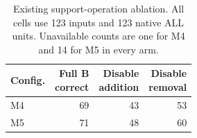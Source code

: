 \begin{table}[htbp]
\centering
\small
\caption{Existing support-operation ablation. All cells use 123 inputs and 123 native ALL units.
Unavailable counts are one for M4 and 14 for M5 in every arm.}
\label{tab:ablations}
\setlength{\tabcolsep}{5pt}
\begin{tabular}{@{}lrrr@{}}
\toprule
Config. & \shortstack{Full B\\correct} & \shortstack{Disable\\addition} & \shortstack{Disable\\removal} \\
\midrule
M4 & 69 & 43 & 53 \\
M5 & 71 & 48 & 60 \\
\bottomrule
\end{tabular}
\end{table}
